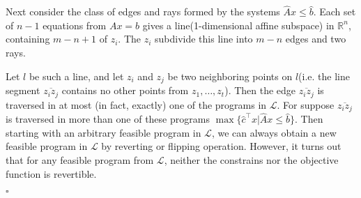 \documentclass{article}
\newenvironment{proof}{{\it Proof.}}{ \hfill $\square$}
\def\R{{\mathbb R}}
\begin{document}
\begin{proof}
Next consider the class of edges and rays formed by the systems $\hat{A}x\leq\hat{b}$. Each set of $n-1$ equations from $Ax=b$ gives a line(1-dimensional affine subspace) in $\R^n$, containing $m-n+1$ of $z_i$. The $z_i$ subdivide this line into $m-n$ edges and two rays.

Let $l$ be such a line, and let $z_i$ and $z_j$ be two neighboring points on $l$(i.e. the line segment $\overline{z_i z_j}$ contains no other points from $z_1,\dots,z_t$). Then the edge $\overline{z_i z_j}$ is traversed in at most (in fact, exactly) one of the programs in $\mathcal{L}$. For suppose $\overline{z_i z_j}$ is traversed in more than one of these programs $\max\{\hat{c}^\top x|\hat{A}x\leqslant \hat{b}\}$. Then starting with an arbitrary feasible program in $\mathcal{L}$, we can always obtain a new feasible program in $\mathcal{L}$ by reverting or flipping operation. However, it turns out that for any feasible program from $\mathcal{L}$, neither the constrains nor the objective function is revertible.


\end{proof}
\end{document}
